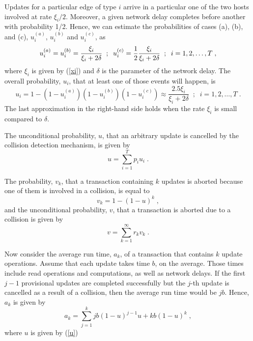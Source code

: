\documentclass[runningheads]{llncs}
\begin{document}
Updates for a particular edge of type $i$ arrive in a particular one of the
two hosts involved at rate $\xi_i/2$. Moreover, a given network delay
completes before another with probability 1/2. Hence, we can estimate
the probabilities of cases (a), (b), and (c), $u_i^{(a)}$, $u_i^{(b)}$ and
$u_i^{(c)}$, as
\begin{equation} \label{uia}
u_i^{(a)} = u_i^{(b)} = \frac{\xi_i}{\xi_i + 2\delta}\;\;;\;\;
u_i^{(c)} = \small{\frac{1}{2}} \frac{\xi_i}{\xi_i + 2\delta}
\;\;;\;\;i=1,2,\ldots,T\;,
\end{equation}
where $\xi_i$ is given by (\ref{xi}) and $\delta$ is the parameter of the
network delay. The overall probability, $u_i$, that at least one of those
events will happen, is
\begin{equation} \label{ui}
u_i = 1 - (1-u_i^{(a)})(1-u_i^{(b)})(1-u_i^{(c)})
\approx \frac{2.5\xi_i}{\xi_i + 2\delta}
\;\;;\;\;i=1,2,\ldots,T\;.
\end{equation}
The last approximation in the right-hand side holds when the rate $\xi_i$
is small compared to $\delta$.

The unconditional probability, $u$, that an arbitrary update is cancelled
by the collision detection mechanism, is given by
\begin{equation} \label{u}
u = \sum_{i=1}^T p_iu_i\;.
\end{equation}

The probability, $v_k$, that a transaction containing $k$ updates is aborted
because one of them is involved in a collision, is equal to
\begin{equation} \label{vk}
v_k = 1 - (1-u)^k\;,
\end{equation}
and the unconditional probability, $v$, that a transaction is aborted due to a
collision is given by
\begin{equation} \label{v}
v = \sum_{k=1}^\infty r_kv_k\;.
\end{equation}

Now consider the average run time, $a_k$, of a transaction that contains $k$
update operations. Assume that each update takes time $b$, on the average.
Those times include read operations and computations, as well as network delays.
If the first $j-1$ provisional updates are completed successfully but the $j$-th
update is cancelled as a result of a collision, then the average run time would
be $jb$. Hence, $a_k$ is given by
\begin{equation} \label{ak}
a_k = \sum_{j=1}^k jb(1-u)^{j-1}u + kb(1-u)^k\;,
\end{equation}
where $u$ is given by (\ref{u})
\end{document}
